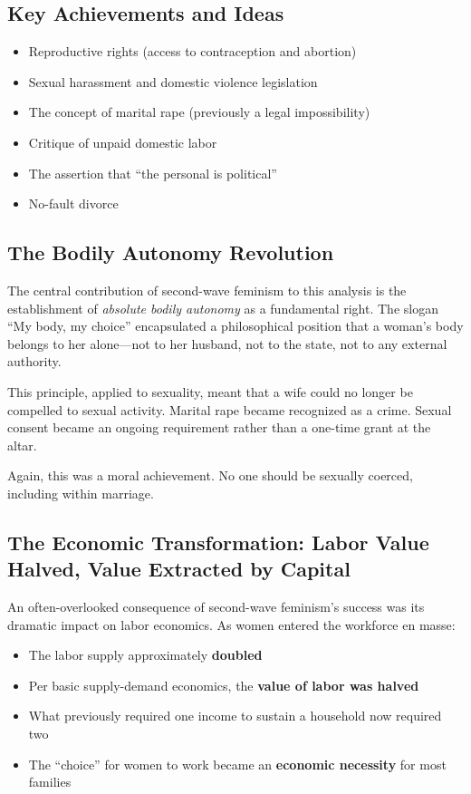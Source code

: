\documentclass[12pt,openany]{book}
\numberwithin{equation}{chapter}
\begin{document}
\subsection{Key Achievements and Ideas}

\begin{itemize}
    \item Reproductive rights (access to contraception and abortion)
    \item Sexual harassment and domestic violence legislation
    \item The concept of marital rape (previously a legal impossibility)
    \item Critique of unpaid domestic labor
    \item The assertion that ``the personal is political''
    \item No-fault divorce
\end{itemize}

\subsection{The Bodily Autonomy Revolution}

The central contribution of second-wave feminism to this analysis is the establishment of \textit{absolute bodily autonomy} as a fundamental right. The slogan ``My body, my choice'' encapsulated a philosophical position that a woman's body belongs to her alone---not to her husband, not to the state, not to any external authority.

This principle, applied to sexuality, meant that a wife could no longer be compelled to sexual activity. Marital rape became recognized as a crime. Sexual consent became an ongoing requirement rather than a one-time grant at the altar.

Again, this was a moral achievement. No one should be sexually coerced, including within marriage.

\subsection{The Economic Transformation: Labor Value Halved, Value Extracted by Capital}

An often-overlooked consequence of second-wave feminism's success was its dramatic impact on labor economics. As women entered the workforce en masse:

\begin{itemize}
    \item The labor supply approximately \textbf{doubled}
    \item Per basic supply-demand economics, the \textbf{value of labor was halved}
    \item What previously required one income to sustain a household now required two
    \item The ``choice'' for women to work became an \textbf{economic necessity} for most families
\end{itemize}
\end{document}
